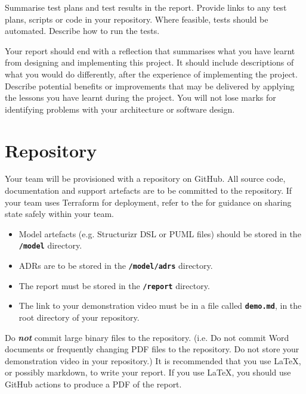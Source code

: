 \documentclass{csse4400}
\begin{document}
Summarise test plans and test results in the report.
Provide links to any test plans, scripts or code in your repository.
Where feasible, tests should be automated.
Describe how to run the tests.

Your report should end with a reflection that summarises what you have learnt from designing and implementing this project.
It should include descriptions of what you would do differently, after the experience of implementing the project.
Describe potential benefits or improvements that may be delivered by applying the lessons you have learnt during the project.
You will not lose marks for identifying problems with your architecture or software design.


\section{Repository}
Your team will be provisioned with a repository on GitHub.
All source code, documentation and support artefacts are to be committed to the repository.
If your team uses Terraform for deployment, refer to the
for guidance on sharing state safely within your team.

\begin{itemize}[itemsep=3pt,parsep=3pt]
    \item Model artefacts (e.g. Structurizr DSL or PUML files) should be stored in the \textbf{\texttt{/model}} directory.
    \item ADRs are to be stored in the \textbf{\texttt{/model/adrs}} directory.
    \item The report must be stored in the \textbf{\texttt{/report}} directory.
    \item The link to your demonstration video must be in a file called \textbf{\texttt{demo.md}}, in the root directory of your repository.
\end{itemize}

Do \textbf{\emph{not}} commit large binary files to the repository.
(i.e. Do not commit Word documents or frequently changing PDF files to the repository.
Do not store your demonstration video in your repository.)
It is recommended that you use LaTeX, or possibly markdown, to write your report.
If you use LaTeX, you should use GitHub actions to produce a PDF of the report.
\end{document}
